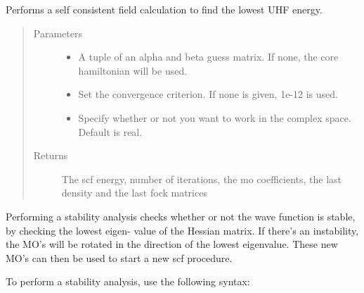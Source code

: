 \documentclass[letterpaper,10pt,english]{sphinxmanual}
\begin{document}
\begin{fulllineitems}
\begin{fulllineitems}
\label{\detokenize{UHF:ghf.UHF.UHF.scf}}
Performs a self consistent field calculation to find the lowest UHF energy.
\begin{quote}\begin{description}
\item[{Parameters}] \leavevmode\begin{itemize}
\item {} 
 \textendash{} A tuple of an alpha and beta guess matrix. If none, the core hamiltonian will be used.

\item {} 
 \textendash{} Set the convergence criterion. If none is given, 1e-12 is used.

\item {} 
 \textendash{} Specify whether or not you want to work in the complex space. Default is real.

\end{itemize}

\item[{Returns}] \leavevmode
The scf energy, number of iterations, the mo coefficients, the last density and the last fock matrices

\end{description}\end{quote}

\end{fulllineitems}


\begin{fulllineitems}
\label{\detokenize{UHF:ghf.UHF.UHF.stability}}
Performing a stability analysis checks whether or not the wave function is stable, by checking the lowest eigen-
value of the Hessian matrix. If there’s an instability, the MO’s will be rotated in the direction
of the lowest eigenvalue. These new MO’s can then be used to start a new scf procedure.

To perform a stability analysis, use the following syntax:


\end{fulllineitems}
\end{fulllineitems}
\end{document}
